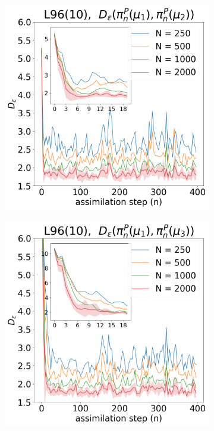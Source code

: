 \begin{figure}[!t]
\centering
\begin{subfigure}{0.3\textwidth}
\includegraphics[width=\columnwidth]{numerical-fs/plots/figures-BPF-L96_10-1-dist_1_vs_2.png}
\end{subfigure}\hspace{0mm}%
\begin{subfigure}{0.3\textwidth}
\includegraphics[width=\columnwidth]{numerical-fs/plots/figures-BPF-L96_10-1-dist_1_vs_3.png}

\end{subfigure}
\end{figure}
